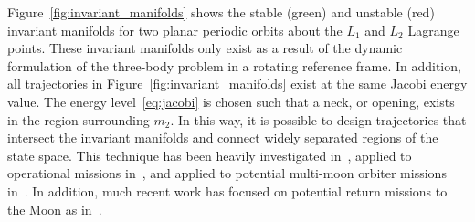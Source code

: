 Figure~\ref{fig:invariant_manifolds} shows the stable (green) and unstable (red) invariant manifolds for two planar periodic orbits about the \(L_1\) and \(L_2\) Lagrange points. 
These invariant manifolds only exist as a result of the dynamic formulation of the three-body problem in a rotating reference frame. 
In addition, all trajectories in Figure~\ref{fig:invariant_manifolds} exist at the same Jacobi energy value. 
The energy level~\eqref{eq:jacobi} is chosen such that a neck, or opening, exists in the region surrounding \(m_2\).
In this way, it is possible to design trajectories that intersect the invariant manifolds and connect widely separated regions of the state space. 
This technique has been heavily investigated in~\cite{koon2000}, applied to operational missions in~\cite{koon1999}, and applied to potential multi-moon orbiter missions in~\cite{tanaka2011}.
In addition, much recent work has focused on potential return missions to the Moon as in~\cite{zanzottera2012,campagnola2012,mingotti2011,ozimek2010a,mingotti2009}.

